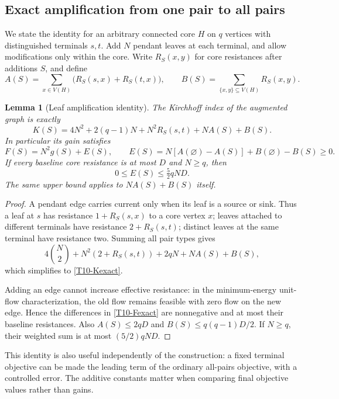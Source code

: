 \documentclass[11pt,a4paper]{article}
\newtheorem{lemma}[theorem]{Lemma}
\theoremstyle{definition}\newtheorem{definition}[theorem]{Definition}
\theoremstyle{remark}\newtheorem{remark}[theorem]{Remark}
\numberwithin{equation}{section}
\begin{document}
\subsection{Exact amplification from one pair to all pairs}\label{T10-sec-4}
We state the identity for an arbitrary connected core $H$ on $q$ vertices with distinguished terminals $s,t$. Add $N$ pendant leaves at each terminal, and allow modifications only within the core. Write $R_S(x,y)$ for core resistances after additions $S$, and define
\[
 A(S)=\sum_{x\in V(H)}\bigl(R_S(s,x)+R_S(t,x)\bigr),\qquad
 B(S)=\sum_{\{x,y\}\subseteq V(H)}R_S(x,y).
\]
\begin{lemma}[Leaf amplification identity]\label{T10-amplify}
The Kirchhoff index of the augmented graph is exactly
\begin{equation}\label{T10-Kexact}
 K(S)=4N^2+2(q-1)N+N^2R_S(s,t)+NA(S)+B(S).
\end{equation}
In particular its gain satisfies
\begin{equation}\label{T10-Fexact}
 F(S)=N^2g(S)+E(S),\qquad
 E(S)=N[A(\varnothing)-A(S)]+B(\varnothing)-B(S)\ge0.
\end{equation}
If every baseline core resistance is at most $D$ and $N\ge q$, then
\[
 0\le E(S)\le\tfrac52qND.
\]
The same upper bound applies to $NA(S)+B(S)$ itself.
\end{lemma}
\begin{proof}
A pendant edge carries current only when its leaf is a source or sink. Thus a leaf at $s$ has resistance $1+R_S(s,x)$ to a core vertex $x$; leaves attached to different terminals have resistance $2+R_S(s,t)$; distinct leaves at the same terminal have resistance two. Summing all pair types gives
\[
 4\binom{N}{2}+N^2(2+R_S(s,t))+2qN+NA(S)+B(S),
\]
which simplifies to \eqref{T10-Kexact}.

Adding an edge cannot increase effective resistance: in the minimum-energy unit-flow characterization, the old flow remains feasible with zero flow on the new edge. Hence the differences in \eqref{T10-Fexact} are nonnegative and at most their baseline resistances. Also $A(S)\le2qD$ and $B(S)\le q(q-1)D/2$. If $N\ge q$, their weighted sum is at most $(5/2)qND$.
\end{proof}
This identity is also useful independently of the construction: a fixed terminal objective can be made the leading term of the ordinary all-pairs objective, with a controlled error. The additive constants matter when comparing final objective values rather than gains.
\end{document}
